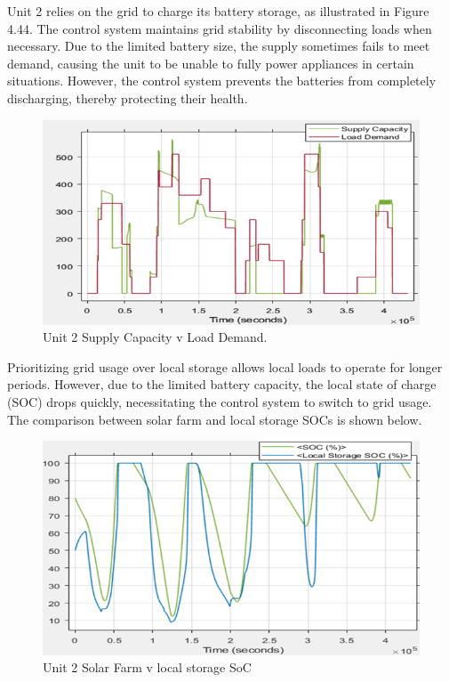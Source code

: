 Unit 2 relies on the grid to charge its battery storage, as illustrated in Figure 4.44. The control system maintains grid stability by disconnecting loads when necessary. Due to the limited battery size, the supply sometimes fails to meet demand, causing the unit to be unable to fully power appliances in certain situations. However, the control system prevents the batteries from completely discharging, thereby protecting their health.\par

\begin{figure}[H]
	\centering
	\includegraphics[totalheight=6cm]{Figures/Unit 2 Supply Capacity v Load Demand.png}
	\caption{Unit 2 Supply Capacity v Load Demand.}
\end{figure} 
Prioritizing grid usage over local storage allows local loads to operate for longer periods. However, due to the limited battery capacity, the local state of charge (SOC) drops quickly, necessitating the control system to switch to grid usage. The comparison between solar farm and local storage SOCs is shown below.\par
\begin{figure}[H]
	\centering
	\includegraphics[totalheight=6cm]{Figures/Unit 2 Solar Farm v local storage SoC.png}
	\caption{Unit 2 Solar Farm v local storage SoC}
\end{figure} 
